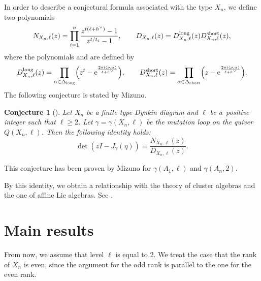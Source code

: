 \documentclass[pdftex]{sigma}
\numberwithin{equation}{section}
\newtheorem{Conjecture}[Theorem]{Conjecture}
 { \theoremstyle{definition}
\newtheorem{Definition}[Theorem]{Definition}
\newtheorem{Note}[Theorem]{Note}
\newtheorem{Example}[Theorem]{Example}
\newtheorem{Remark}[Theorem]{Remark} }
\newcommand{\pair}[1]{\langle{#1}\rangle}
\begin{document}
In order to describe a conjectural formula associated with the type $X_n$, we define two polynomials
		\[N_{X_n,\ell}(z)=\prod_{i=1}^n\frac{z^{t(\ell+h^\vee)}-1}{z^{t/t_i}-1},\qquad D_{X_n,\ell}(z)=D_{X_n,\ell}^{{\rm long}}(z)D_{X_n,\ell}^{{\rm short}}(z),\]
where the polynomials  and  are defined by
		\[D_{X_n,\ell}^{{\rm long}}(z)=\prod_{\alpha\in\Delta_{{\rm long}}}\Bigl(z^t-{\rm e}^\frac{2\pi {\rm i}\pair{\rho,\alpha}}{\ell+h^\vee}\Bigr),\qquad D_{X_n,\ell}^{{\rm short}}(z)=\prod_{\alpha\in\Delta_{{\rm short}}}\Bigl(z-{\rm e}^\frac{2\pi {\rm i}\pair{\rho,\alpha}}{\ell+h^\vee}\Bigr).\]
The following conjecture is stated by Mizuno.
	\begin{Conjecture}[{\cite[Conjecture 3.8]{M}}]\label{MConj}
	Let $X_n$ be a finite type Dynkin diagram and $\ell$ be a~positive integer such that $\ell\geq2$.
	Let $\gamma=\gamma(X_n,\ell)$ be the mutation loop on the quiver $Q(X_n,\ell)$.
	Then the following identity holds:
		\[\det (zI-J_\gamma(\eta))=\frac{N_{X_n,\ell}(z)}{D_{X_n,\ell}(z)}.\]
	\end{Conjecture}
	\begin{Remark}
	This conjecture has been proven by Mizuno for $\gamma(A_1,\ell)$ and $\gamma(A_n,2)$.
	\end{Remark}
By this identity, we obtain a relationship with the theory of cluster algebras and the one of affine Lie algebras.
See \cite{M}.


	\section{Main results}
	From now, we assume that level $\ell$ is equal to 2.
	We treat the case that the rank of $X_n$ is even, since the argument for the odd rank is parallel to the one for the even rank.
		
\end{document}
